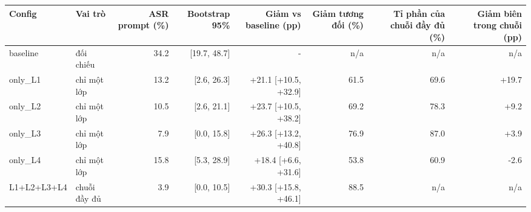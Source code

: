 \begin{tabular}{llrrrrrr}
\toprule
Config & Vai trò & ASR prompt (\%) & Bootstrap 95\% & Giảm vs baseline (pp) & Giảm tương đối (\%) & Tỉ phần của chuỗi đầy đủ (\%) & Giảm biên trong chuỗi (pp) \\
\midrule
baseline & đối chiếu & 34.2 & [19.7, 48.7] & - & n/a & n/a & n/a \\
only\_L1 & chỉ một lớp & 13.2 & [2.6, 26.3] & +21.1 [+10.5, +32.9] & 61.5 & 69.6 & +19.7 \\
only\_L2 & chỉ một lớp & 10.5 & [2.6, 21.1] & +23.7 [+10.5, +38.2] & 69.2 & 78.3 & +9.2 \\
only\_L3 & chỉ một lớp & 7.9 & [0.0, 15.8] & +26.3 [+13.2, +40.8] & 76.9 & 87.0 & +3.9 \\
only\_L4 & chỉ một lớp & 15.8 & [5.3, 28.9] & +18.4 [+6.6, +31.6] & 53.8 & 60.9 & -2.6 \\
L1+L2+L3+L4 & chuỗi đầy đủ & 3.9 & [0.0, 10.5] & +30.3 [+15.8, +46.1] & 88.5 & n/a & n/a \\
\bottomrule
\end{tabular}
